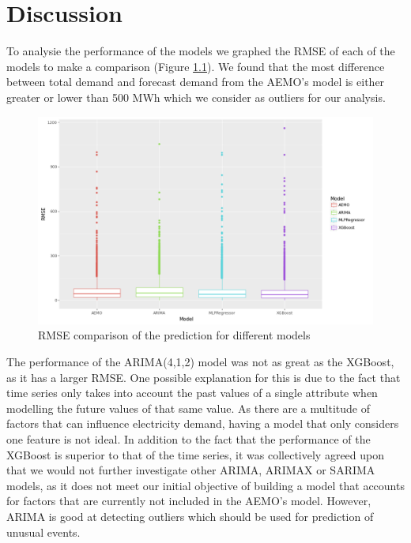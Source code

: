 \documentclass[mstat,12pt]{unswthesis}
\begin{document}
\hypertarget{discussion}{%
\chapter{Discussion}\label{discussion}}

To analysie the performance of the models we graphed the RMSE of each of
the models to make a comparison (Figure \ref{image16}). We found that
the most difference between total demand and forecast demand from the
AEMO's model is either greater or lower than 500 MWh which we consider
as outliers for our analysis.

\begin{figure}[H]
\includegraphics[width=140mm]{image16.png}
\caption{RMSE comparison of the prediction for different models}
\label{image16}
\end{figure}

The performance of the ARIMA(4,1,2) model was not as great as the
XGBoost, as it has a larger RMSE. One possible explanation for this is
due to the fact that time series only takes into account the past values
of a single attribute when modelling the future values of that same
value. As there are a multitude of factors that can influence
electricity demand, having a model that only considers one feature is
not ideal. In addition to the fact that the performance of the XGBoost
is superior to that of the time series, it was collectively agreed upon
that we would not further investigate other ARIMA, ARIMAX or SARIMA
models, as it does not meet our initial objective of building a model
that accounts for factors that are currently not included in the AEMO's
model. However, ARIMA is good at detecting outliers which should be used
for prediction of unusual events.
\end{document}

